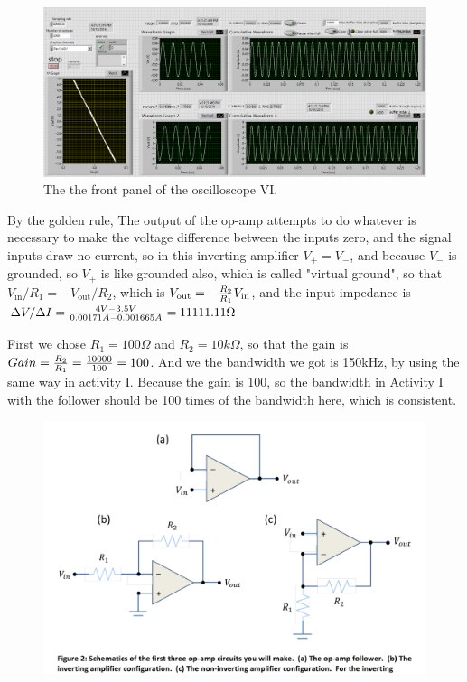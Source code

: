 \documentclass[11pt]{article}
\begin{document}
\begin{figure}[H]
 \begin{center}
  \includegraphics[width=\linewidth/1]{act2100Hz}
  \caption{The the front panel of the oscilloscope VI.}
  \label{fig:act2100Hz}
 \end{center}
\end{figure}

By the golden rule, The output of the op-amp attempts to do whatever is necessary to make the voltage difference between the inputs zero, and the signal inputs draw no current, so in this inverting amplifier
$V_{\mathrm{+}}=V_{\mathrm{-}}$, and because $V_{\mathrm{-}}$ is grounded, so $V_{\mathrm{+}}$ is like grounded also, which is called "virtual ground", so that $V_{\mathrm{in}}/R_{\mathrm{1}}=-V_{\mathrm{out}}/R_{\mathrm{2}}$, which is $V_{\mathrm{out}}=-{R_{\mathrm{2}} \over{R_{\mathrm{1}}}}V_{\mathrm{in}}$, and the input impedance is $\Delta V/ \Delta I={{4V-3.5V}\over{0.00171A-0.001665A}}=11111.11\Omega$


First we chose $R_{\mathrm{1}}=100 \Omega$ and $R_{\mathrm{2}}=10k \Omega$, so that the gain is $Gain={R_{\mathrm{2}} \over{R_{\mathrm{1}}}}={10000 \over100}=100$. And we the bandwidth we got is 150kHz, by using the same way in activity I. Because the gain is 100, so the bandwidth in Activity I with the follower should be 100 times of the bandwidth here, which is consistent.

\begin{figure}[H]
 \begin{center}
  \includegraphics[width=\linewidth/2]{amplifier}
  \caption{}
  \label{fig:amplfier}
 \end{center}
\end{figure}
\end{document}
